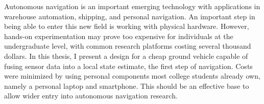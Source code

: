 \begin{abstractpage}
Autonomous navigation is an important emerging technology with applications in warehouse automation, shipping, and  personal navigation. An important step in being able to enter this new field is working with physical hardware. However, hands-on experimentation may prove too expensive for individuals at the undergraduate level, with common research platforms costing several thousand dollars. In this thesis, I present a design for a cheap ground vehicle capable of fusing sensor data into a local state estimate, the first step of navigation. Costs were minimized by using personal components most college students already own, namely a personal laptop and smartphone. This should be an effective base to allow wider entry into autonomous navigation research.
\end{abstractpage}
